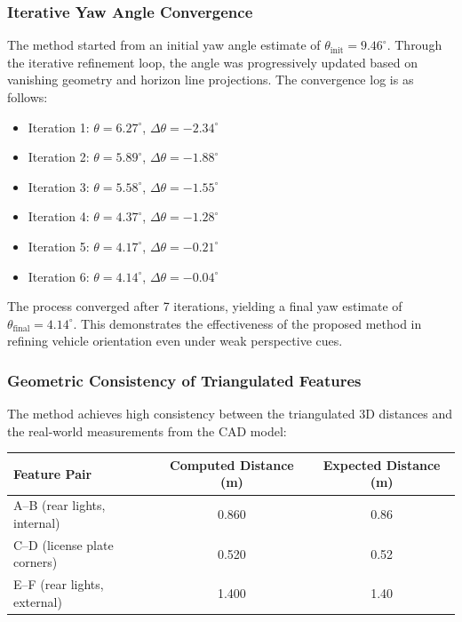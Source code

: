 \subsubsection{Iterative Yaw Angle Convergence}
The method started from an initial yaw angle estimate of $\theta_{\text{init}} = 9.46^\circ$. Through the iterative refinement loop, the angle was progressively updated based on vanishing geometry and horizon line projections. The convergence log is as follows:

\begin{itemize}
    \item Iteration 1: $\theta = 6.27^\circ$, $\Delta\theta = -2.34^\circ$
    \item Iteration 2: $\theta = 5.89^\circ$, $\Delta\theta = -1.88^\circ$
    \item Iteration 3: $\theta = 5.58^\circ$, $\Delta\theta = -1.55^\circ$
    \item Iteration 4: $\theta = 4.37^\circ$, $\Delta\theta = -1.28^\circ$
    \item Iteration 5: $\theta = 4.17^\circ$, $\Delta\theta = -0.21^\circ$
    \item Iteration 6: $\theta = 4.14^\circ$, $\Delta\theta = -0.04^\circ$
\end{itemize}

The process converged after 7 iterations, yielding a final yaw estimate of $\theta_{\text{final}} = \mathbf{4.14^\circ}$. This demonstrates the effectiveness of the proposed method in refining vehicle orientation even under weak perspective cues.

\subsubsection{Geometric Consistency of Triangulated Features}

The method achieves high consistency between the triangulated 3D distances and the real-world measurements from the CAD model:

\begin{center}
    \begin{tabular}{lcc}
        \toprule
        \textbf{Feature Pair} & \textbf{Computed Distance (m)} & \textbf{Expected Distance (m)} \\
        \midrule
        A--B (rear lights, internal) & 0.860 & 0.86 \\
        C--D (license plate corners) & 0.520 & 0.52 \\
        E--F (rear lights, external) & 1.400 & 1.40 \\
        \bottomrule
    \end{tabular}
\end{center}

